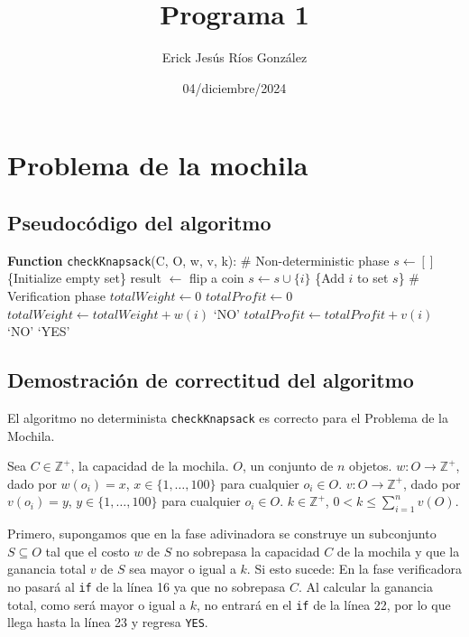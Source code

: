 \documentclass[12pt]{article}
\title{Programa 1}
\author{Erick Jes\'us R\'ios Gonz\'alez}
\date{04/diciembre/2024}
\begin{document}
\maketitle

\section{Problema de la mochila}

\subsection{Pseudocódigo del algoritmo}

\begin{algorithm}[H]
    \caption{\texttt{checkKnapsack} Function}
    \begin{algorithmic}[1]
    \STATE \textbf{Function} \texttt{checkKnapsack}(C, O, w, v, k):
    \STATE \# Non-deterministic phase
    \STATE $s \gets []$ \{Initialize empty set\}
        \STATE result $\gets$ flip a coin
            \STATE $s \gets s \cup \{i\}$ \{Add $i$ to set $s$\}
        \ENDIF
    \ENDFOR
    \STATE \# Verification phase
    \STATE $totalWeight \gets 0$
    \STATE $totalProfit \gets 0$
        \STATE $totalWeight \gets totalWeight + w(i)$
    \ENDFOR
        \RETURN `NO'
    \ENDIF
        \STATE $totalProfit \gets totalProfit + v(i)$
    \ENDFOR
        \RETURN `NO'
    \ENDIF
    \RETURN `YES'
    \end{algorithmic}
    \end{algorithm}
    

\subsection{Demostración de correctitud del algoritmo}

El algoritmo no determinista \texttt{checkKnapsack} es correcto para el Problema de la Mochila.


Sea
$C \in \mathbb{Z}^+$, la capacidad de la mochila.
$O$, un conjunto de $n$ objetos.
$w : O \to \mathbb{Z}^+$, dado por $w(o_i) = x$, $x \in \{1, \dots, 100\}$ para cualquier $o_i \in O$.
$v : O \to \mathbb{Z}^+$, dado por $v(o_i) = y$, $y \in \{1, \dots, 100\}$ para cualquier $o_i \in O$.
$k \in \mathbb{Z}^+$, $0 < k \leq \sum_{i=1}^n v(O)$.


Primero, supongamos que en la fase adivinadora se construye un subconjunto $S \subseteq O$ tal que el costo $w$ de $S$ no sobrepasa la capacidad $C$ de la mochila y que la ganancia total $v$ de $S$ sea mayor o igual a $k$. Si esto sucede:
En la fase verificadora no pasará al \texttt{if} de la línea 16 ya que no sobrepasa $C$.
Al calcular la ganancia total, como será mayor o igual a $k$, no entrará en el \texttt{if} de la línea 22, por lo que llega hasta la línea 23 y regresa \texttt{YES}.
\end{document}
